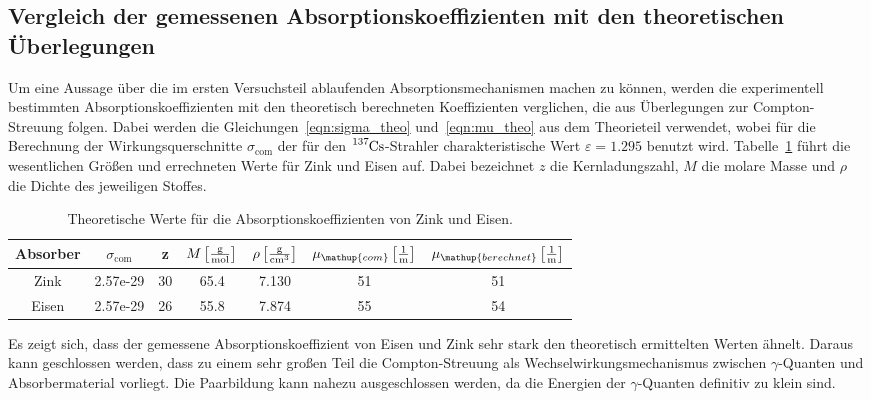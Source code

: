 \documentclass[
  bibliography=totoc,     %
  captions=tableheading,  %
  titlepage=firstiscover, %
]{scrartcl}
\begin{document}
\subsection{Vergleich der gemessenen Absorptionskoeffizienten mit den theoretischen Überlegungen}

Um eine Aussage über die im ersten Versuchsteil ablaufenden Absorptionsmechanismen
machen zu können, werden die experimentell bestimmten Absorptionskoeffizienten
mit den theoretisch berechneten Koeffizienten verglichen, die aus Überlegungen
zur Compton-Streuung folgen. Dabei werden die Gleichungen~\eqref{eqn:sigma_theo}
und~\eqref{eqn:mu_theo} aus dem Theorieteil verwendet, wobei für die Berechnung
der Wirkungsquerschnitte $\sigma_{\mathup{com}}$ der für den
$\ce{^{137}Cs}$-Strahler charakteristische Wert $\varepsilon = \num{1.295}$
benutzt wird. Tabelle~\ref{tab:theoriewerte} führt die wesentlichen Größen und
errechneten Werte für Zink und Eisen auf. Dabei bezeichnet $z$ die
Kernladungszahl, $M$ die molare Masse und $\rho$ die Dichte des jeweiligen
Stoffes.

\begin{table}[ht]
	\begin{center}
        \caption{Theoretische Werte für die Absorptionskoeffizienten von Zink und Eisen.}
        \label{tab:theoriewerte}
		\begin{tabular}{ccccccc}
			\toprule
			{Absorber} & {$\sigma_{\mathup{com}}$} & {z} & {$M\left[\si{\frac{\gram}{\mol}}\right]$} &
            {$\rho\left[\si{\frac{\gram}{\centi\metre\cubed}}\right]$} &
            {$\mu_{\mathup{com}}\left[\si{\frac{1}{\metre}}\right]$} &
            {$\mu_{\mathup{berechnet}}\left[\si{\frac{1}{\metre}}\right]$} \\
			\midrule
			Zink  & 2.57e-29 & 30 &  65.4 &  7.130 & 51 & 51\\
			Eisen & 2.57e-29 & 26 &  55.8 &  7.874 & 55 & 54\\
			\bottomrule
		\end{tabular}
	\end{center}
\end{table}

Es zeigt sich, dass der gemessene Absorptionskoeffizient von Eisen und Zink sehr
stark den theoretisch ermittelten Werten ähnelt. Daraus kann
geschlossen werden, dass zu einem sehr großen Teil die Compton-Streuung als
Wechselwirkungsmechanismus zwischen $\gamma$-Quanten und Absorbermaterial
vorliegt. Die Paarbildung kann nahezu ausgeschlossen werden, da die Energien der $\gamma$-Quanten definitiv zu klein sind.
\end{document}
